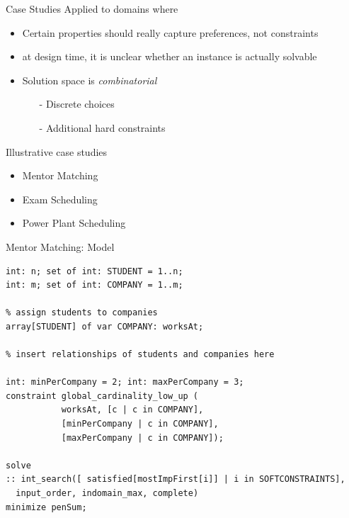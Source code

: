 \documentclass[10pt,xcolor={dvipsnames},fleqn]{beamer}
\begin{document}
\begin{frame}{Case Studies}
Applied to domains where 
\begin{itemize}
\item Certain properties should really capture \alert{preferences}, not constraints
\item at design time, it is \alert{unclear} whether an instance is actually solvable
\item Solution space is \emph{combinatorial}
\begin{itemize}
\item[-] Discrete choices
\item[-] Additional hard constraints
\end{itemize}
\end{itemize}

\vspace*{2ex}

Illustrative case studies 
\begin{itemize}
\item Mentor Matching
\item Exam Scheduling
\item Power Plant Scheduling
\end{itemize}
\end{frame}

\begin{frame}[fragile]{Mentor Matching: Model}
\begin{lstlisting}
int: n; set of int: STUDENT = 1..n;
int: m; set of int: COMPANY = 1..m;

% assign students to companies
array[STUDENT] of var COMPANY: worksAt;

% insert relationships of students and companies here

int: minPerCompany = 2; int: maxPerCompany = 3;
constraint global_cardinality_low_up ( 
           worksAt, [c | c in COMPANY], 
           [minPerCompany | c in COMPANY], 
           [maxPerCompany | c in COMPANY]); 
           
solve 
:: int_search([ satisfied[mostImpFirst[i]] | i in SOFTCONSTRAINTS], 
  input_order, indomain_max, complete)
minimize penSum;
\end{lstlisting}
\end{frame}
\end{document}
